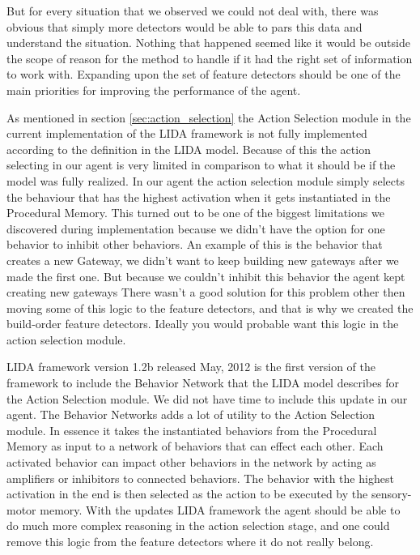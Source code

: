 But for every situation that we observed we could not deal with, there was obvious that simply more detectors would be able to pars this data and understand the situation. Nothing that happened seemed like it would be outside the scope of reason for the method to handle if it had the right set of information to work with. Expanding upon the set of feature detectors should be one of the main priorities for improving the performance of the agent.

As mentioned in section \ref{sec:action_selection} the Action Selection module in the current implementation of the LIDA framework is not fully implemented according to the definition in the LIDA model. Because of this the action selecting in our agent is very limited in comparison to what it should be if the model was fully realized. In our agent the action selection module simply selects the behaviour that has the highest activation when it gets instantiated in the Procedural Memory. This turned out to be one of the biggest limitations we discovered during implementation because we didn't have the option for one behavior to inhibit other behaviors. An example of this is the behavior that creates a new Gateway, we didn't want to keep building new gateways after we made the first one. But because we couldn't inhibit this behavior the agent kept creating new gateways There wasn't a good solution for this problem other then moving some of this logic to the feature detectors, and that is why we created the build-order feature detectors. Ideally you would probable want this logic in the action selection module. 

LIDA framework version 1.2b released May, 2012 is the first version of the framework to include the Behavior Network that the LIDA model describes for the Action Selection module. We did not have time to include this update in our agent. The Behavior Networks adds a lot of utility to the Action Selection module. In essence it takes the instantiated behaviors from the Procedural Memory as input to a network of behaviors that can effect each other. Each activated behavior can impact other behaviors in the network by acting as amplifiers or inhibitors to connected behaviors. The behavior with the highest activation in the end is then selected as the action to be executed by the sensory-motor memory. With the updates LIDA framework the agent should be able to do much more complex reasoning in the action selection stage, and one could remove this logic from the feature detectors where it do not really belong.


